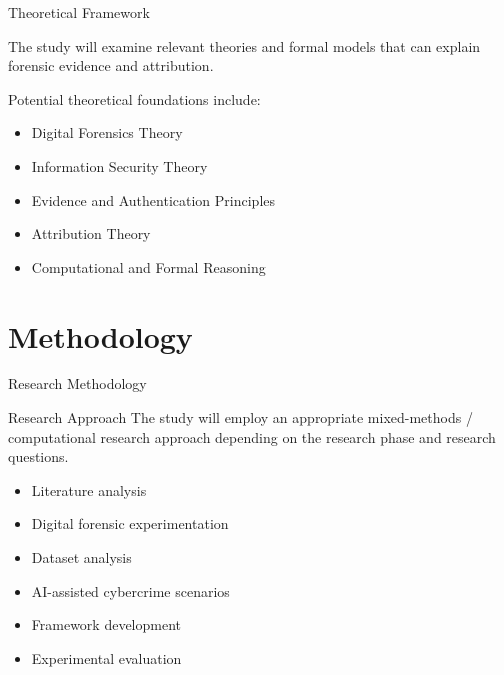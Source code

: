 \documentclass[aspectratio=169,11pt]{beamer}
\begin{document}
	\begin{frame}{Theoretical Framework}
		
		The study will examine relevant theories and formal
		models that can explain forensic evidence and attribution.
		
		\vspace{0.4cm}
		
		Potential theoretical foundations include:
		
		\begin{itemize}
			
			\item Digital Forensics Theory
			
			\item Information Security Theory
			
			\item Evidence and Authentication Principles
			
			\item Attribution Theory
			
			\item Computational and Formal Reasoning
			
		\end{itemize}
		
	\end{frame}
	
	
	\section{Methodology}
	
	\begin{frame}{Research Methodology}
		
		\begin{block}{Research Approach}
			The study will employ an appropriate mixed-methods /
			computational research approach depending on the
			research phase and research questions.
		\end{block}
		
		\vspace{0.5cm}
		
		\begin{itemize}
			
			\item Literature analysis
			
			\item Digital forensic experimentation
			
			\item Dataset analysis
			
			\item AI-assisted cybercrime scenarios
			
			\item Framework development
			
			\item Experimental evaluation
			
		\end{itemize}
		
	\end{frame}
	
\end{document}
